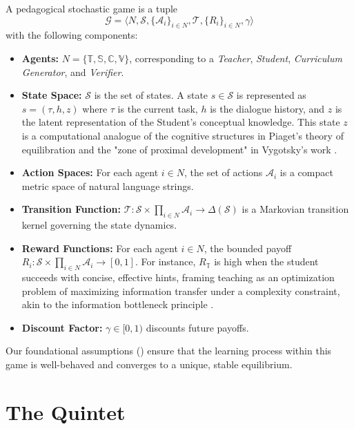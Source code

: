 \begin{definition}
A pedagogical stochastic game is a tuple
\[
\mathcal{G} = \langle N, \mathcal{S}, \{\mathcal{A}_i\}_{i \in N}, \mathcal{T}, \{R_i\}_{i \in N}, \gamma \rangle
\]
with the following components:
\begin{itemize}
    \item \textbf{Agents:} $N = \{\mathbb{T}, \mathbb{S}, \mathbb{C}, \mathbb{V}\}$,
    corresponding to a \emph{Teacher}, \emph{Student}, \emph{Curriculum Generator},
    and \emph{Verifier}.
    \item \textbf{State Space:} $\mathcal{S}$ is the set of states. A state $s \in \mathcal{S}$
    is represented as $s = (\tau, h, z)$ where $\tau$ is the current task,
    $h$ is the dialogue history, and $z$ is the latent representation of the Student's conceptual knowledge. This state $z$ is a computational analogue of the cognitive structures in Piaget's theory of equilibration \citep{piaget1977equilibration} and the "zone of proximal development" in Vygotsky's work \citep{vygotsky1978mind}.
    \item \textbf{Action Spaces:}
    For each agent $i \in N$, the set of actions $\mathcal{A}_i$ is a compact metric space of natural language strings.
    \item \textbf{Transition Function:}
    $\mathcal{T}: \mathcal{S} \times \prod_{i \in N}\mathcal{A}_i \to \Delta(\mathcal{S})$
    is a Markovian transition kernel governing the state dynamics.
    \item \textbf{Reward Functions:}
    For each agent $i \in N$, the bounded payoff
    $R_i: \mathcal{S} \times \prod_{i \in N}\mathcal{A}_i \to [0,1]$. For instance, $R_{\mathbb{T}}$ is high when the student succeeds with concise, effective hints, framing teaching as an optimization problem of maximizing information transfer under a complexity constraint, akin to the information bottleneck principle \citep{tishby2000information}.
    \item \textbf{Discount Factor:}
    $\gamma \in [0,1)$ discounts future payoffs.
\end{itemize}
\end{definition}

Our foundational assumptions () ensure that the learning process within this game is well-behaved and converges to a unique, stable equilibrium.

\section{The Quintet}

